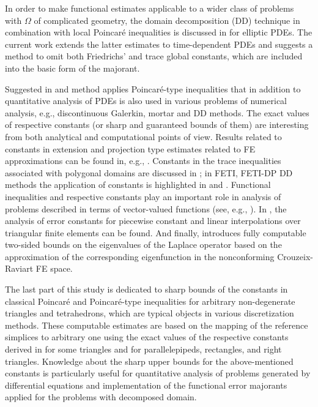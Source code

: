 In order to make functional estimates applicable to a wider class of problems with 
$\Omega$ of complicated geometry, the domain decomposition (DD) technique in 
combination with local Poincar\'{e} inequalities is discussed in 
\cite[Section 3.5.3]{RepinDeGruyter2008}
for elliptic PDEs. The current work extends the latter 
estimates to time-dependent PDEs and suggests a method to omit both Friedrichs' and 
trace global constants, which are included into the basic form of the majorant. 

Suggested in \cite{RefMatculevichNeitaanmakiRepin2015} and
\cite{RefMatculevichRepinPoincare2014} method applies Poincar\'{e}-type inequalities
that in addition to quantitative analysis of PDEs is also used in various problems 
of numerical analysis, e.g., discontinuous Galerkin, mortar and DD methods. 
The exact values of respective constants (or sharp and guaranteed 
bounds of them) are interesting from both analytical and computational points of 
view. 
Results related to constants in extension and projection type estimates related to 
FE approximations can be found in, e.g., \cite{Mikhlin1986,Ciarlet1978}. Constants 
in the trace inequalities associated with polygonal domains are discussed in 
\cite{CarstensenSauter2004}; in FETI, FETI-DP DD methods the application of 
constants is highlighted in \cite{Klawonnatall2008,Dohrmann2008} and 
\cite{ToselliWidlund2005}. Functional inequalities and respective constants play an important role in analysis of problems described in terms of vector-valued functions 
(see, e.g., \cite{Fuchs2011, Pauly2015}). 
In \cite{KikuchiLiu2007,XuefengOishi2013}, the analysis of error constants for 
piecewise constant and linear interpolations over triangular finite elements can be 
found. And finally, \cite{CarstensenGedicke2014} introduces fully computable 
two-sided bounds on the eigenvalues of the Laplace operator based on the 
approximation of the corresponding 
eigenfunction in the nonconforming Crouzeix-Raviart FE space.


The last part of this study is dedicated to sharp bounds of the constants in 
classical Poincar\'{e} and 
Poincar\'{e}-type inequalities for arbitrary non-degenerate triangles and tetrahedrons, which 
are typical objects in various discretization methods. These computable estimates 
are based on the mapping of the reference simplices to arbitrary one using the 
exact values of the respective constants derived in 
\cite{Pinsky1980, HoshikawaUrakawa2010,KikuchiLiu2007} for some triangles and 
\cite{NazarovRepin2014} for parallelepipeds, rectangles, and right triangles. 
Knowledge about the sharp upper bounds for the above-mentioned constants is particularly 
useful for quantitative analysis of problems generated by differential equations 
and implementation of the functional error majorants applied for the problems with decomposed domain.

